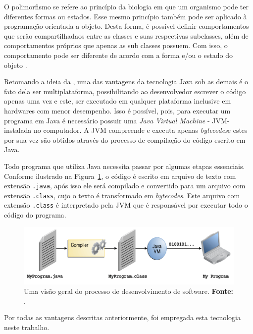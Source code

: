 O polimorfismo se refere ao princípio da biologia em que um organismo pode ter diferentes formas ou estados. Esse mesmo princípio também pode ser aplicado à programação orientada a objeto. Desta forma, é possível definir comportamentos que serão compartilhadaos entre as classes e suas respectivas subclasses, além de comportamentos próprios que apenas as sub classes possuem. Com isso, o comportamento pode ser diferente de acordo com a forma e/ou o estado do objeto \cite{polymorphism_oracle}.

\par Retomando a ideia da , uma das vantagens da tecnologia Java sob as demais é o fato dela ser multiplataforma, possibilitando ao desenvolvedor escrever o código apenas uma vez e este, ser executado em qualquer plataforma inclusive em hardwares com menor desempenho. Isso é possível, pois, para executar um programa em Java é necessário possuir uma \textit{Java Virtual Machine} - JVM\footnotemark[13] - instalada no computador. A JVM compreende e executa apenas \textit{bytecodes}\footnotemark[14] e estes por sua vez são obtidos através do processo de compilação do código escrito em Java.



\par Todo programa que utiliza Java necessita passar por algumas etapas essenciais. Conforme ilustrado na Figura~\ref{fig:processo_compilacao_java}, o código é escrito em arquivo de texto com extensão \texttt{.java}, após isso ele será compilado e convertido para um arquivo com extensão \texttt{.class}, cujo o texto é transformado em \textit{bytecodes}. Este arquivo com extensão \texttt{.class} é interpretado pela JVM que é responsável por executar todo o código do programa.

\begin{figure}[h!]
	\centerline{\includegraphics[scale=1]{./imagens/processo_compilacao_java.png}}
	\caption[Uma visão geral do processo de desenvolvimento de software.]
	{Uma visão geral do processo de desenvolvimento de software. \textbf{Fonte:} .}
	\label{fig:processo_compilacao_java}
\end{figure}

\par Por todas as vantagens descritas anteriormente, foi empregada esta tecnologia neste trabalho.
